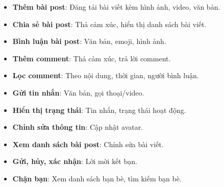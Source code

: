 

\vspace{0.5cm} %

\begin{itemize}
    \renewcommand{\labelitemi}{-} %
    \item \textbf{Thêm bài post}: Đăng tải bài viết kèm hình ảnh, video, văn bản.
    \item \textbf{Chia sẻ bài post}: Thả cảm xúc, hiển thị danh sách bài viết.
    \item \textbf{Bình luận bài post}: Văn bản, emoji, hình ảnh.
\end{itemize}

\vspace{0.3cm}

\begin{itemize}
    \renewcommand{\labelitemi}{-}
    \item \textbf{Thêm comment}: Thả cảm xúc, trả lời comment.
    \item \textbf{Lọc comment}: Theo nội dung, thời gian, người bình luận.
\end{itemize}

\vspace{0.3cm}

\begin{itemize}
    \renewcommand{\labelitemi}{-}
    \item \textbf{Gửi tin nhắn}: Văn bản, gọi thoại/video.
    \item \textbf{Hiển thị trạng thái}: Tin nhắn, trạng thái hoạt động.
\end{itemize}

\vspace{0.3cm}

\begin{itemize}
    \renewcommand{\labelitemi}{-}
    \item \textbf{Chỉnh sửa thông tin}: Cập nhật avatar.
    \item \textbf{Xem danh sách bài post}: Chỉnh sửa bài viết.
\end{itemize}

\vspace{0.3cm}

\begin{itemize}
    \renewcommand{\labelitemi}{-}
    \item \textbf{Gửi, hủy, xác nhận}: Lời mời kết bạn.
    \item \textbf{Chặn bạn}: Xem danh sách bạn bè, tìm kiếm bạn bè.
\end{itemize}
